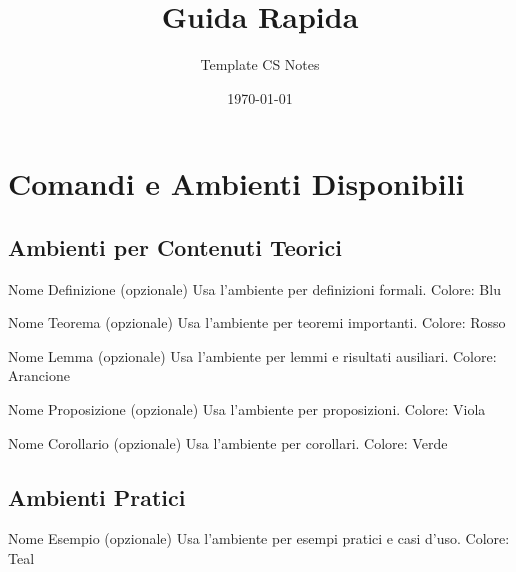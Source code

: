 \documentclass{csnotes}
\title{Guida Rapida}
\author{Template CS Notes}
\date{\today}
\begin{document}
\maketitlepage{}
\tableofcontents
\listoftheorems
\listofexamples
\listofalgos

\newpage


\section{Comandi e Ambienti Disponibili}

\subsection{Ambienti per Contenuti Teorici}\label{sec:theoretical_environments}

\begin{definition}{Nome Definizione (opzionale)}
Usa l'ambiente  per definizioni formali.
Colore: Blu
\end{definition}

\begin{theorem}{Nome Teorema (opzionale)}
Usa l'ambiente  per teoremi importanti.
Colore: Rosso
\end{theorem}

\begin{lemma}{Nome Lemma (opzionale)}
Usa l'ambiente  per lemmi e risultati ausiliari.
Colore: Arancione
\end{lemma}

\begin{proposition}{Nome Proposizione (opzionale)}
Usa l'ambiente  per proposizioni.
Colore: Viola
\end{proposition}

\begin{corollary}{Nome Corollario (opzionale)}
Usa l'ambiente  per corollari.
Colore: Verde
\end{corollary}

\subsection{Ambienti Pratici}\label{sec:practical_environments}

\begin{example}{Nome Esempio (opzionale)}
Usa l'ambiente  per esempi pratici e casi d'uso.
Colore: Teal
\end{example}
\end{document}
